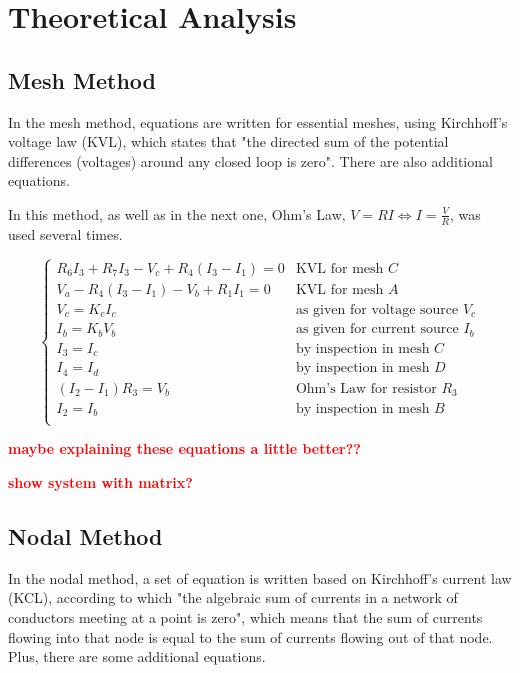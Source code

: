 \section{Theoretical Analysis}
\label{sec:analysis}

\subsection{Mesh Method}
\par
In the mesh method, equations are written for essential meshes, using Kirchhoff's voltage law (KVL), which states that "the directed sum of the potential differences (voltages) around any closed loop is zero". There are also additional equations.

\par
In this method, as well as in the next one, Ohm's Law, $V=RI \Leftrightarrow I = \frac{V}{R}$, was used several times.


\begin{equation}
\begin{cases}
R_6 I_3 + R_7 I_3 - V_c + R_4(I_3-I_1) = 0 & \mbox{KVL for mesh $C$}\\
V_a - R_4 (I_3-I_1) - V_b + R_1 I_1 = 0 & \mbox{KVL for mesh $A$}\\
V_c = K_c I_c & \mbox{as given for voltage source $V_c$} \\
I_b = K_b V_b & \mbox{as given for current source $I_b$} \\
I_3 = I_c & \mbox{by inspection in mesh $C$}\\
I_4 = I_d & \mbox{by inspection in mesh $D$}\\
(I_2-I_1) R_3 = V_b & \mbox{Ohm's Law for resistor $R_3$}\\
I_2 = I_b & \mbox{by inspection in mesh $B$}\\
\end{cases}
\end{equation}

\par
\textcolor{red}{\textbf{maybe explaining these equations a little better??}}
\par
\textcolor{red}{\textbf{show system with matrix?}}





\subsection{Nodal Method}
\par
In the nodal method, a set of equation is written based on Kirchhoff's current law (KCL), according to which "the algebraic sum of currents in a network of conductors meeting at a point is zero", which means that the sum of currents flowing into that node is equal to the sum of currents flowing out of that node. Plus, there are some additional equations.

